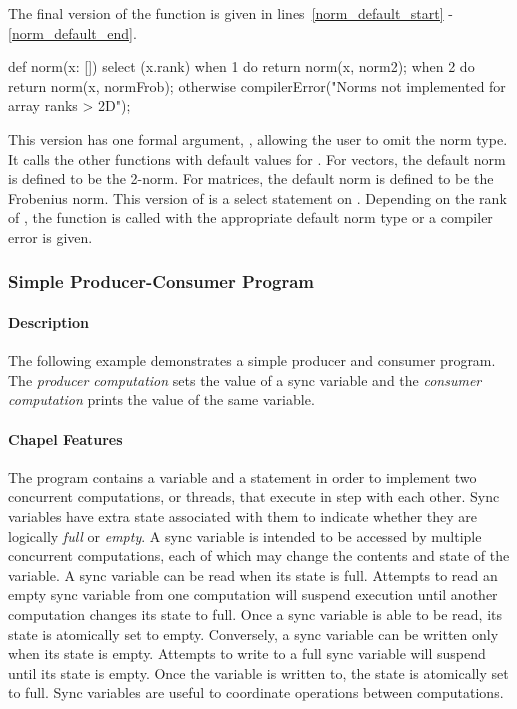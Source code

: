 The final version of the  function is given in 
lines~\ref{norm_default_start} - \ref{norm_default_end}.
\begin{chapel}
  def norm(x: []) { 
    select (x.rank) { 
      when 1 do return norm(x, norm2);  
      when 2 do return norm(x, normFrob); 
      otherwise compilerError("Norms not implemented for array ranks > 2D"); 
    }   
  }  
\end{chapel}
This version has one formal argument, , allowing the user to 
omit the norm type.  It calls the other  functions with default values for 
.  For vectors, the default norm is defined to be the 2-norm.
For matrices, the default norm is defined to be the Frobenius norm.  This 
version of  is a select statement on .  Depending
on the rank of , the  function is called with the
appropriate default norm type or a compiler error is given.

\subsubsection{Simple Producer-Consumer Program}
\paragraph{Description}
The following example demonstrates a simple producer and consumer program.
The {\em producer computation} sets the value of a sync variable and the 
{\em consumer computation} prints the value of the same variable.

\paragraph{Chapel Features}
The program contains a  variable and a  statement 
in order to implement two concurrent computations, or threads, that execute 
in step with each other.
Sync variables have extra state associated with them to
indicate whether they are logically {\em full} or {\em empty}.  
A sync variable
is intended to be accessed by multiple concurrent computations, each of which may
change the contents and state of the variable.  A sync variable
can be read when its state is full.  Attempts to read an empty sync variable from one
computation will suspend execution until another computation changes its state to full.
Once a sync variable is able to be read, its state is atomically set to empty.
Conversely, a sync variable can be written only when its state is empty.  Attempts
to write to a full sync variable will suspend until its state is empty.  Once the variable
is written to, the state is atomically set to full.  Sync variables are useful
to coordinate operations between computations.

